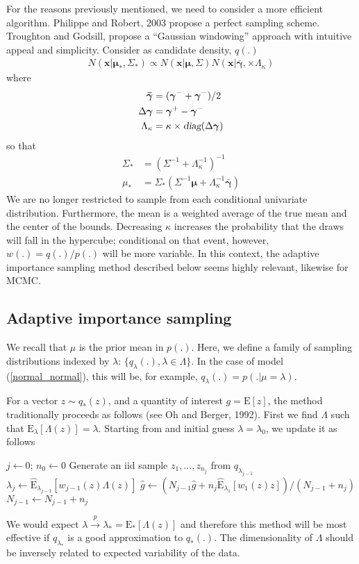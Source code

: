 \documentclass[11pt]{article}
\begin{document}
For the reasons previously mentioned, we need to consider a more
efficient algorithm. Philippe and Robert, 2003 propose a perfect
sampling scheme. Troughton and Godsill, propose a ``Gaussian
windowing'' approach with intuitive appeal and simplicity. Consider
as candidate density, $q(.)$
\begin{align}
N(\mathbf{x}|\boldsymbol{\mu}_*,\Sigma_*)\propto
N(\mathbf{x}|\boldsymbol{\mu},\Sigma)N(\mathbf{x}|\boldsymbol{\bar\gamma},\times
 \Lambda_{\kappa})
\end{align}where
\begin{align}
\boldsymbol{\bar\gamma}
&=(\boldsymbol{\gamma}^{-}+\boldsymbol{\gamma}^{-})/2\\
\Delta\boldsymbol\gamma&=\boldsymbol{\gamma}^{+}-\boldsymbol{\gamma}^{-}\\
\Lambda_{\kappa}&=\kappa\times\textsl{diag}(\Delta\boldsymbol\gamma)
\end{align}so that
\begin{align}
\Sigma_*&=(\Sigma^{-1}+\Lambda_{\kappa}^{-1})^{-1}\\
\mu_*&=\Sigma_*(\Sigma^{-1}\boldsymbol{\mu}+\Lambda_{\kappa}^{-1}\boldsymbol{\bar{\gamma}})
\end{align}We are no longer restricted to sample from each
conditional univariate distribution. Furthermore, the mean is a
weighted average of the true mean and the center of the bounds.
Decreasing $\kappa$ increases the probability that the draws will
fall in the hypercube; conditional on that event, however,
$w(.)=q(.)/p(.)$ will be more variable. In this context, the
adaptive importance sampling method described below seems highly
relevant, likewise for MCMC.

\subsection{Adaptive importance sampling}
We recall that $\mu$ is the prior mean in $p(.)$. Here, we define a
family of sampling distributions indexed by $\lambda$:
$\{q_{\lambda}(.),\lambda\in \Lambda\}$. In the case of model
(\ref{normal_normal}), this will be, for example,
$q_{\lambda}(.)=p(.|\mu=\lambda)$.

For a vector $z\sim q_*(z)$, and a quantity of interest
$g=\mathrm{E}[z]$, the method traditionally proceeds as follows (see
Oh and Berger, 1992). First we find $\Lambda$ such that
$\mathrm{E}_\lambda[\Lambda(z)]=\lambda$. Starting from and initial
guess $\lambda=\lambda_0$, we update it as follows
\begin{algorithmic}
\STATE $j\leftarrow 0$; $n_0\leftarrow 0$  \STATE
Generate an iid sample $z_1,...,z_{n_{j}}$ from $q_{\lambda_{j-1}}$
\STATE
$\lambda_{j}\leftarrow\hat{\mathrm{E}}_{\lambda_{j-1}}[w_{j-1}(z)\Lambda(z)]$
\STATE $\hat g \leftarrow (N_{j-1} \hat g + n_j
\hat{\mathrm{E}}_{\lambda_1}[w_1(z)z])/(N_{j-1}+n_j)$ \STATE
$N_{j-1}\leftarrow N_{j-1}+n_j$\ENDFOR
\end{algorithmic}
We would expect $\lambda
\xrightarrow{p}\lambda_*=\mathrm{E}_*[\Lambda(z)]$ and therefore
this method will be most effective if $q_{\lambda_*}$ is a good
approximation to $q_*(.)$. The dimensionality of $\Lambda$ should be
inversely related to expected variability of the data.
\end{document}
